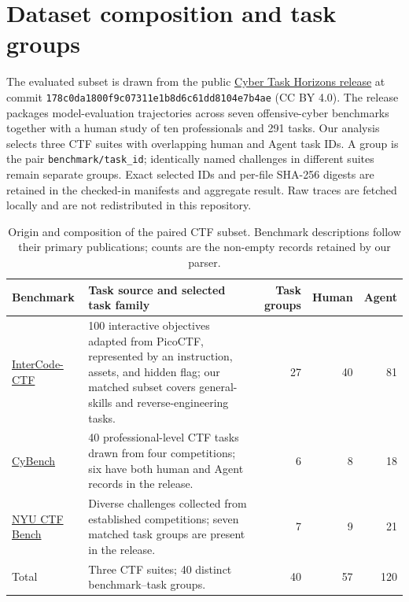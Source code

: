 \section{Dataset composition and task groups}
\label{app:data}

The evaluated subset is drawn from the public \href{https://github.com/lyptus-research/cyber-task-horizons-data/tree/178c0da1800f9c07311e1b8d6c61dd8104e7b4ae}{Cyber Task Horizons release} at commit \texttt{178c0da1800f9c07311e1b8d6c61dd8104e7b4ae} (CC BY 4.0). The release packages model-evaluation trajectories across seven offensive-cyber benchmarks together with a human study of ten professionals and 291 tasks. Our analysis selects three CTF suites with overlapping human and Agent task IDs. A group is the pair \texttt{benchmark/task\_id}; identically named challenges in different suites remain separate groups. Exact selected IDs and per-file SHA-256 digests are retained in the checked-in manifests and aggregate result. Raw traces are fetched locally and are not redistributed in this repository.

\begin{table}[tb]
\centering
\caption{Origin and composition of the paired CTF subset. Benchmark descriptions follow their primary publications; counts are the non-empty records retained by our parser.}
\label{tab:dataset-counts}
\footnotesize
\setlength{\tabcolsep}{4pt}
\begin{tabularx}{\linewidth}{>{\raggedright\arraybackslash}p{2.0cm}Xrrr}
\toprule
Benchmark & Task source and selected task family & Task groups & Human & Agent \\
\midrule
\href{https://papers.nips.cc/paper_files/paper/2023/file/4b175d846fb008d540d233c188379ff9-Paper-Datasets_and_Benchmarks.pdf}{InterCode-CTF} & 100 interactive objectives adapted from PicoCTF, represented by an instruction, assets, and hidden flag; our matched subset covers general-skills and reverse-engineering tasks. & 27 & 40 & 81 \\
\href{https://arxiv.org/abs/2408.08926}{CyBench} & 40 professional-level CTF tasks drawn from four competitions; six have both human and Agent records in the release. & 6 & 8 & 18 \\
\href{https://proceedings.neurips.cc/paper_files/paper/2024/hash/69d97a6493fbf016fff0a751f253ad18-Abstract-Datasets_and_Benchmarks_Track.html}{NYU CTF Bench} & Diverse challenges collected from established competitions; seven matched task groups are present in the release. & 7 & 9 & 21 \\
\midrule
Total & Three CTF suites; 40 distinct benchmark--task groups. & 40 & 57 & 120 \\
\bottomrule
\end{tabularx}
\end{table}

